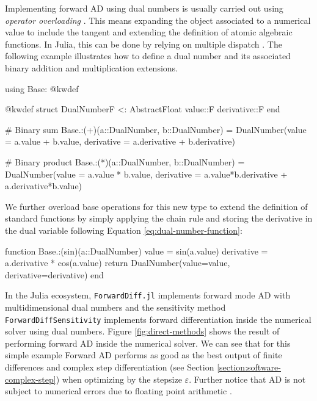 Implementing forward AD using dual numbers is usually carried out using \textit{operator overloading} \cite{Neuenhofen_2018}. 
This means expanding the object associated to a numerical value to include the tangent and extending the definition of atomic algebraic functions. 
In Julia, this can be done by relying on multiple dispatch \cite{Julialang_2017}. 
The following example illustrates how to define a dual number and its associated binary addition and multiplication extensions. 
\begin{jllisting}
using Base: @kwdef

@kwdef struct DualNumber{F <: AbstractFloat}
    value::F
    derivative::F
end

# Binary sum
Base.:(+)(a::DualNumber, b::DualNumber) = DualNumber(value = a.value + b.value, derivative = a.derivative + b.derivative)

# Binary product 
Base.:(*)(a::DualNumber, b::DualNumber) = DualNumber(value = a.value * b.value, derivative = a.value*b.derivative + a.derivative*b.value)
\end{jllisting}
We further overload base operations for this new type to extend the definition of standard functions by simply applying the chain rule and storing the derivative in the dual variable following Equation \eqref{eq:dual-number-function}:
\begin{jllisting}
function Base.:(sin)(a::DualNumber)
    value = sin(a.value)
    derivative = a.derivative * cos(a.value)
    return DualNumber(value=value, derivative=derivative)
end
\end{jllisting}

In the Julia ecosystem, \texttt{ForwardDiff.jl} implements forward mode AD with multidimensional dual numbers \cite{RevelsLubinPapamarkou2016} and the sensitivity method \texttt{ForwardDiffSensitivity} implements forward differentiation inside the numerical solver using dual numbers. 
Figure \ref{fig:direct-methods} shows the result of performing forward AD inside the numerical solver.
We can see that for this simple example Forward AD performs as good as the best output of finite differences and complex step differentiation (see Section \ref{section:software-complex-step}) when optimizing by the stepsize $\varepsilon$. 
Further notice that AD is not subject to numerical errors due to floating point arithmetic \cite{Griewank:2008kh}.

